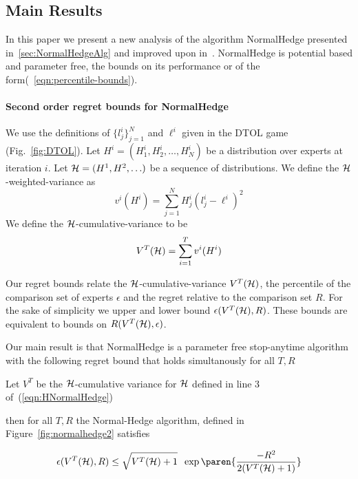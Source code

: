 \documentclass[anon,12pt]{colt2024} %
\begin{document}
\subsection{Main Results}
In this paper we present a new analysis of the algorithm NormalHedge
presented in~\ref{sec:NormalHedgeAlg} and improved upon
in~\cite{luo2015achieving}.  NormalHedge is potential based and
parameter free, the bounds on its performance or of the
form(~\ref{eqn:percentile-bounds}).

\paragraph*{Second order regret bounds for NormalHedge}

\begin{definition}
We use the definitions of $\{l^i_j\}_{j=1}^N$ and $\ell^i$ given in the DTOL game (Fig.~\ref{fig:DTOL}).
Let $H^i=(H^i_1, H^i_2,\ldots , H^i_N) $ be a distribution over experts at iteration $i$.
Let ${\cal H}=(H^1,H^2,\ldots)$ be a sequence of distributions.
We define the ${\cal H}$-weighted-variance as
\begin{equation}
  v^i(H^i)=\sum_{j=1}^N H^i_j (l_j^i-\ell^i)^2
\end{equation}
We define the ${\cal H}$-cumulative-variance to be
$$V^T({\cal H}) = \sum_{i=1}^T v^i(H^i)$$
\end{definition}

Our regret bounds relate the ${\cal H}$-cumulative-variance $V^T({\cal H})$,
the percentile of the comparison set of experts $\epsilon$ and the regret relative to the comparison set $R$.
For the sake of simplicity we upper and lower bound $\epsilon(V^T({\cal H}),R)$. These bounds are equivalent
to bounds on $R(V^T({\cal H}),\epsilon)$.
 
Our main result is that NormalHedge is a parameter free
stop-anytime algorithm with the following regret bound that holds simultanously for all $T,R$
\begin{theorem}

Let $V^T$ be the ${\cal H}$-cumulative variance 
for ${\cal H}$ defined in line 3 of~(\ref{eqn:HNormalHedge})

then for all $T,R$ the Normal-Hedge algorithm, defined in Figure~\ref{fig:normalhedge2} satisfies

\begin{equation} \label{eqn:epsilonUpperBound}
  \epsilon(V^T({\cal H}),R) \leq \sqrt{V^T({\cal H})+1} \;\; \exp \paren{\frac{-R^2}{2(V^T({\cal H})+1)}}
\end{equation}
\end{theorem}
\end{document}
